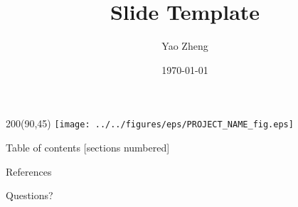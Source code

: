 \documentclass[10pt, aspectratio=169]{beamer}
\title{Slide Template}
\date{\today}
\author{Yao Zheng}
\institute{Virginia Tech}
\begin{document}
\begin{frame}
   \titlepage
   \begin{textblock}{200}(90,45)
    \texttt{[image: ../../figures/eps/PROJECT\_NAME\_fig.eps]}
   \end{textblock}
\end{frame}

\begin{acronym}

\end{acronym}


\begin{frame}{Table of contents}
  [sections numbered]
  \tableofcontents[hideallsubsections]
\end{frame}

\begin{frame}[allowframebreaks]{References}
\nocite{*}
\printbibliography[heading=none]
\end{frame}

\begin{frame}[standout]
\Huge{Questions?}
\end{frame}
\end{document}
